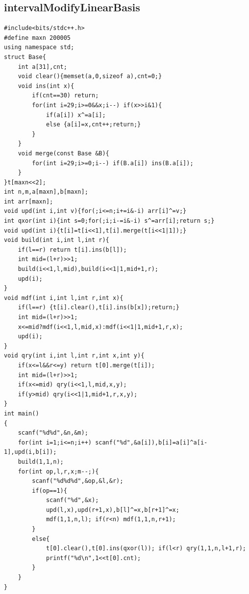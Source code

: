 \documentclass[twoside]{article}
\begin{document}
\subsection{intervalModifyLinearBasis}
\begin{lstlisting}
#include<bits/stdc++.h>
#define maxn 200005
using namespace std;
struct Base{
	int a[31],cnt;
	void clear(){memset(a,0,sizeof a),cnt=0;}
	void ins(int x){
		if(cnt==30) return;
		for(int i=29;i>=0&&x;i--) if(x>>i&1){
			if(a[i]) x^=a[i];
			else {a[i]=x,cnt++;return;}
		}
	}
	void merge(const Base &B){
		for(int i=29;i>=0;i--) if(B.a[i]) ins(B.a[i]);
	}
}t[maxn<<2];
int n,m,a[maxn],b[maxn];
int arr[maxn];
void upd(int i,int v){for(;i<=n;i+=i&-i) arr[i]^=v;}
int qxor(int i){int s=0;for(;i;i-=i&-i) s^=arr[i];return s;}
void upd(int i){t[i]=t[i<<1],t[i].merge(t[i<<1|1]);}
void build(int i,int l,int r){
	if(l==r) return t[i].ins(b[l]);
	int mid=(l+r)>>1;
	build(i<<1,l,mid),build(i<<1|1,mid+1,r);
	upd(i);
}
void mdf(int i,int l,int r,int x){
	if(l==r) {t[i].clear(),t[i].ins(b[x]);return;}
	int mid=(l+r)>>1;
	x<=mid?mdf(i<<1,l,mid,x):mdf(i<<1|1,mid+1,r,x);
	upd(i);
}
void qry(int i,int l,int r,int x,int y){
	if(x<=l&&r<=y) return t[0].merge(t[i]);
	int mid=(l+r)>>1;
	if(x<=mid) qry(i<<1,l,mid,x,y);
	if(y>mid) qry(i<<1|1,mid+1,r,x,y);
}
int main()
{
	scanf("%d%d",&n,&m);
	for(int i=1;i<=n;i++) scanf("%d",&a[i]),b[i]=a[i]^a[i-1],upd(i,b[i]);
	build(1,1,n);
	for(int op,l,r,x;m--;){
		scanf("%d%d%d",&op,&l,&r);
		if(op==1){
			scanf("%d",&x);
			upd(l,x),upd(r+1,x),b[l]^=x,b[r+1]^=x;
			mdf(1,1,n,l); if(r<n) mdf(1,1,n,r+1);
		}
		else{
			t[0].clear(),t[0].ins(qxor(l)); if(l<r) qry(1,1,n,l+1,r);
			printf("%d\n",1<<t[0].cnt);
		}
	}
}
\end{lstlisting}
\end{document}
